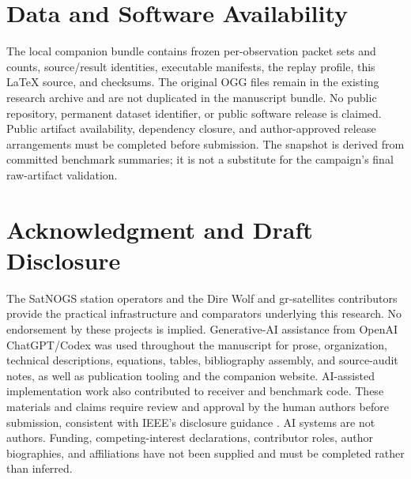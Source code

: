\documentclass{ieeeaccess}
\begin{document}
\section*{Data and Software Availability}
The local companion bundle contains frozen per-observation packet sets and counts, source/result identities, executable manifests, the replay profile, this LaTeX source, and checksums. The original OGG files remain in the existing research archive and are not duplicated in the manuscript bundle. No public repository, permanent dataset identifier, or public software release is claimed. Public artifact availability, dependency closure, and author-approved release arrangements must be completed before submission. The snapshot is derived from committed benchmark summaries; it is not a substitute for the campaign's final raw-artifact validation.

\section*{Acknowledgment and Draft Disclosure}
The SatNOGS station operators and the Dire Wolf and gr-satellites contributors provide the practical infrastructure and comparators underlying this research. No endorsement by these projects is implied. Generative-AI assistance from OpenAI ChatGPT/Codex was used throughout the manuscript for prose, organization, technical descriptions, equations, tables, bibliography assembly, and source-audit notes, as well as publication tooling and the companion website. AI-assisted implementation work also contributed to receiver and benchmark code. These materials and claims require review and approval by the human authors before submission, consistent with IEEE's disclosure guidance \cite{ieeeaccess}. AI systems are not authors. Funding, competing-interest declarations, contributor roles, author biographies, and affiliations have not been supplied and must be completed rather than inferred.



\EOD
\end{document}
